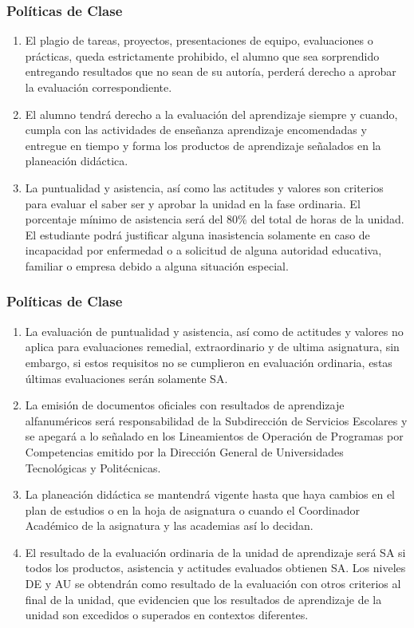 \documentclass{beamer}
\begin{document}
\begin{frame}
	
	\frametitle{Políticas de Clase}
	
	\begin{enumerate}
	
		\item  El plagio de tareas, proyectos, presentaciones de equipo, evaluaciones o prácticas, queda estrictamente prohibido, el alumno que sea sorprendido entregando resultados que no sean de su autoría, perderá derecho a aprobar la evaluación correspondiente.
		\item El alumno tendrá derecho a la evaluación del aprendizaje siempre y cuando, cumpla con las actividades de enseñanza aprendizaje encomendadas y entregue en tiempo y forma los productos de aprendizaje señalados en la planeación didáctica.
		\item La puntualidad y asistencia, así como las actitudes y valores son criterios para evaluar el saber ser y aprobar la unidad en la fase ordinaria. El porcentaje mínimo de asistencia será del 80\% del total de horas de la unidad. El estudiante podrá justificar alguna inasistencia solamente en caso de incapacidad por enfermedad o a solicitud de alguna autoridad educativa, familiar o empresa debido a alguna situación especial.
	\end{enumerate}
	
\end{frame}


\begin{frame}
	
	\frametitle{Políticas de Clase}
	
	\begin{enumerate}
		
   \item La evaluación de puntualidad y asistencia, así como de actitudes y valores no aplica para evaluaciones remedial, extraordinario y de ultima asignatura, sin embargo, si estos requisitos no se cumplieron en evaluación ordinaria, estas últimas evaluaciones serán solamente SA.
	\item La emisión de documentos oficiales con resultados de aprendizaje alfanuméricos será responsabilidad de la Subdirección de Servicios Escolares y se apegará a lo señalado en los Lineamientos de Operación de Programas por Competencias emitido por la Dirección General de Universidades Tecnológicas y Politécnicas.
   \item La planeación didáctica se mantendrá vigente hasta que haya cambios en el plan de estudios o en la hoja de asignatura o cuando el Coordinador Académico de la asignatura y las academias así lo decidan.
	\item El resultado de la evaluación ordinaria de la unidad de aprendizaje será SA si todos los productos, asistencia y actitudes evaluados obtienen SA. Los niveles DE y AU se obtendrán como resultado de la evaluación con otros criterios al final de la unidad, que evidencien que los resultados de aprendizaje de la unidad son excedidos o superados en contextos diferentes.

	\end{enumerate}
	
\end{frame}
\end{document}
